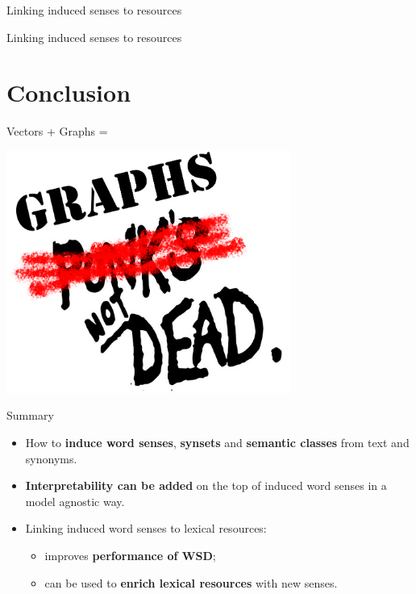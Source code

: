 \documentclass{beamer}
\begin{document}
\begin{frame}{ Linking induced senses to resources }
	
\end{frame}


\begin{frame}{ Linking induced senses to resources }
	
\end{frame}


\section{Conclusion}


\begin{frame}{Vectors + Graphs = \heartsuit }

\centering 
\includegraphics[width=0.7\textwidth]{graphs}

\end{frame}

\begin{frame}{Summary}

\begin{itemize}
	\item How to \textbf{induce word senses}, \textbf{synsets} and \textbf{semantic classes} from text and synonyms.
    \vspace{1em}
    \pause
    
	\item \textbf{Interpretability can be added} on the top of induced word senses in a model agnostic way. 
	\vspace{1em}
    \pause
	
	
	\item Linking induced word senses to lexical resources:
	\begin{itemize} 
		\item improves \textbf{performance of WSD};
		\item can be used to \textbf{enrich lexical resources} with new senses.
	\end{itemize}
	
	
\end{itemize}


\end{frame}
\end{document}
